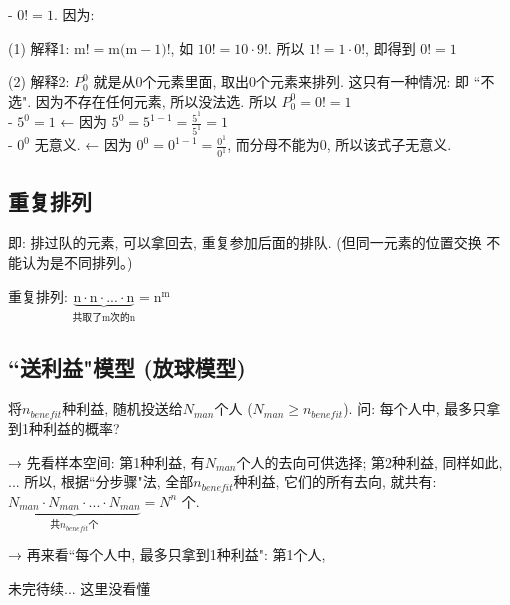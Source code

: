 \documentclass[UTF8]{ctexart}
\begin{document}
	
	
	- $0!=1$.  因为: 
	
	(1) 解释1: $\text{m!}=\text{m(m}-1\text{)!}$, 如 $10! =10 \cdot 9!$. 所以 $1! = 1 \cdot 0!$, 即得到 $0!=1$
	
	(2) 解释2: $P_{0}^{0}$ 就是从0个元素里面, 取出0个元素来排列. 这只有一种情况: 即 ``不选". 因为不存在任何元素, 所以没法选. 所以 $P_0^0=0!=1$ \\
	
	- $5^0 =1$ ← 因为 $5^0=5^{1-1}=\frac{5^1}{5^1}=1$ \\	
	- $0^0$ 无意义. ← 因为 $0^0=0^{1-1}=\frac{0^1}{0^1}$, 而分母不能为0, 所以该式子无意义.
	
	
	
	\subsection{重复排列}
	
	即: 排过队的元素, 可以拿回去, 重复参加后面的排队.  (但同一元素的位置交换 不能认为是不同排列。)
	
	重复排列: $\underset{\text{共取了m次的n}}{\underbrace{\text{n}\cdot \text{n}\cdot ...\cdot \text{n}}}=\text{n}^{\text{m}}	$ \\
	
	
	\subsection{``送利益"模型 (放球模型)}
	
	将$n_{benefit}$种利益, 随机投送给$N_{man}$个人 ($N_{man}\ge n_{benefit}$). 问: 每个人中, 最多只拿到1种利益的概率?
	
	→ 先看样本空间: 第1种利益, 有$N_{man}$个人的去向可供选择; 第2种利益, 同样如此, ... 所以, 根据``分步骤"法, 全部$n_{benefit}$种利益, 它们的所有去向, 就共有: $\underset{\text{共}n_{benefit}\text{个}}{\underbrace{N_{man}\cdot N_{man}\cdot ...\cdot N_{man}}}=N^n	$ 个.
	
	→ 再来看``每个人中, 最多只拿到1种利益": 第1个人,
	
	未完待续... 这里没看懂
	
	
	
	
\end{document}
